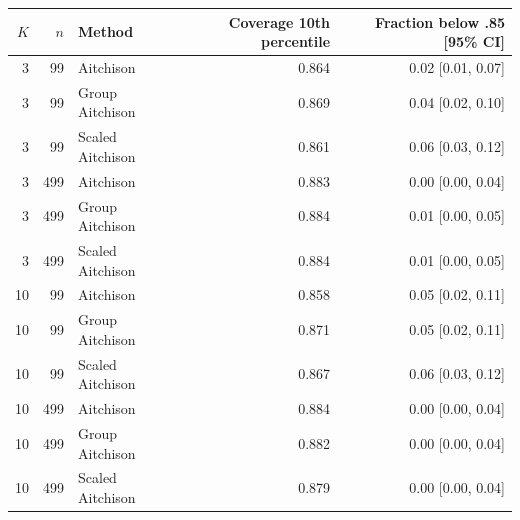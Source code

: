 \begin{tabular}{rrlrr}
\toprule
$K$ & $n$ & Method & Coverage 10th percentile & Fraction below .85 [95\% CI] \\
\midrule
3 & 99 & Aitchison & 0.864 & 0.02 [0.01, 0.07] \\
3 & 99 & Group Aitchison & 0.869 & 0.04 [0.02, 0.10] \\
3 & 99 & Scaled Aitchison & 0.861 & 0.06 [0.03, 0.12] \\
3 & 499 & Aitchison & 0.883 & 0.00 [0.00, 0.04] \\
3 & 499 & Group Aitchison & 0.884 & 0.01 [0.00, 0.05] \\
3 & 499 & Scaled Aitchison & 0.884 & 0.01 [0.00, 0.05] \\
10 & 99 & Aitchison & 0.858 & 0.05 [0.02, 0.11] \\
10 & 99 & Group Aitchison & 0.871 & 0.05 [0.02, 0.11] \\
10 & 99 & Scaled Aitchison & 0.867 & 0.06 [0.03, 0.12] \\
10 & 499 & Aitchison & 0.884 & 0.00 [0.00, 0.04] \\
10 & 499 & Group Aitchison & 0.882 & 0.00 [0.00, 0.04] \\
10 & 499 & Scaled Aitchison & 0.879 & 0.00 [0.00, 0.04] \\
\bottomrule
\end{tabular}
